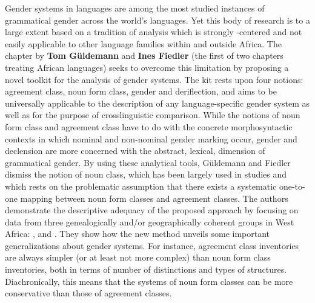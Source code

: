 \documentclass[output=collectionpaper]{langsci/langscibook}
\begin{document}
Gender systems in  languages are among the most studied instances of grammatical gender across the world’s languages. Yet this body of research is to a large extent based on a tradition of analysis which is strongly -centered and not easily applicable to other language families within and outside Africa. The chapter by \textbf{Tom Güldemann} and \textbf{Ines Fiedler} (the first of two chapters treating African languages) seeks to overcome this limitation by proposing a novel toolkit for the analysis of  gender systems. The kit rests upon four notions: agreement class, noun form class, gender and deriflection, and aims to be universally applicable to the description of any language-specific gender system as well as for the purpose of crosslinguistic comparison. While the notions of noun form class and agreement class have to do with the concrete morphosyntactic contexts in which nominal and non-nominal gender marking occur, gender and declension are more concerned with the abstract, lexical, dimension of grammatical gender. By using these analytical tools, Güldemann and Fiedler dismiss the notion of noun class, which has been largely used in  studies and which rests on the problematic assumption that there exists a systematic one-to-one mapping between noun form classes and agreement classes. The authors demonstrate the descriptive adequacy of the proposed approach by focusing on data from three genealogically and/or geographically coherent  groups in West Africa: ,  and . They show how the new method unveils some important generalizations about  gender systems. For instance, agreement class inventories are always simpler (or at least not more complex) than noun form class inventories, both in terms of number of distinctions and types of structures. Diachronically, this means that the systems of noun form classes can be more conservative than those of agreement classes.
\end{document}
